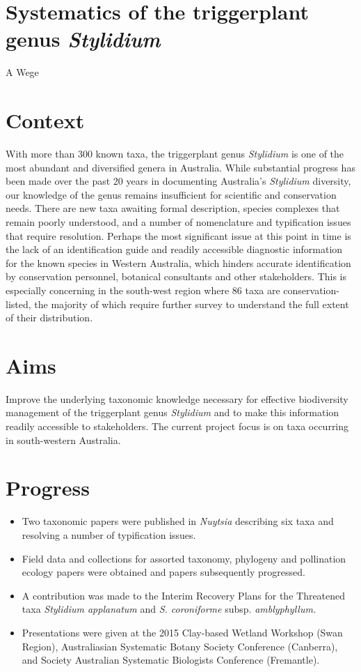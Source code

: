 \documentclass[version=last,
    paper=a4, %
    10pt, %
    usenames,
    dvipsnames,
    oneside, %
    headings=openany, %
    DIV=15 %
]{scrbook}
\begin{document}
\section*{Systematics of the triggerplant genus \emph{Stylidium}
}

A Wege


\section*{Context}
With more than 300 known taxa, the triggerplant genus \emph{Stylidium}
is one of the most abundant and diversified genera in Australia. While
substantial progress has been made over the past 20 years in documenting
Australia's \emph{Stylidium} diversity, our knowledge of the genus
remains insufficient for scientific and conservation needs. There are
new taxa awaiting formal description, species complexes that remain
poorly understood, and a number of nomenclature and typification issues
that require resolution. Perhaps the most significant issue at this
point in time is the lack of an identification guide and readily
accessible diagnostic information for the known species in Western
Australia, which hinders accurate identification by conservation
personnel, botanical consultants and other stakeholders. This is
especially concerning in the south-west region where 86 taxa are
conservation-listed, the majority of which require further survey to
understand the full extent of their distribution.



\section*{Aims}
Improve the underlying taxonomic knowledge necessary for effective
biodiversity management of the triggerplant genus \emph{Stylidium} and
to make this information readily accessible to stakeholders. The current
project focus is on taxa occurring in south-western Australia.



\section*{Progress}
\begin{itemize}
\itemsep1pt\parskip0pt
\item
  Two taxonomic papers were published in \emph{Nuytsia} describing six
  taxa and resolving a number of typification issues.
\item
  Field data and collections for assorted taxonomy, phylogeny and
  pollination ecology papers were obtained and papers subsequently
  progressed.
\item
  A contribution was made to the Interim Recovery Plans for the
  Threatened taxa \emph{Stylidium applanatum} and \emph{S. coroniforme}
  subsp. \emph{amblyphyllum.}
\item
  Presentations were given at the 2015 Clay-based Wetland Workshop (Swan
  Region), Australiasian Systematic Botany Society Conference
  (Canberra), and Society Australian Systematic Biologists Conference
  (Fremantle).
\end{itemize}
\end{document}
